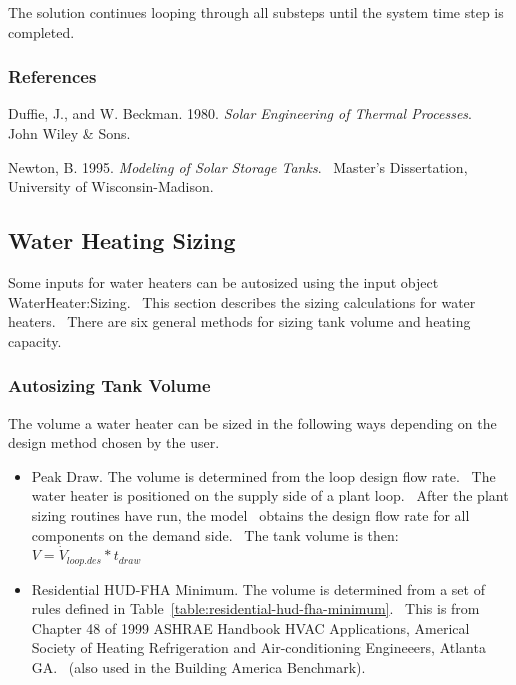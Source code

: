 The solution continues looping through all substeps until the system time step is completed.

\subsubsection{References}\label{references-1-017}

Duffie, J., and W. Beckman. 1980. \emph{Solar Engineering of Thermal Processes}.~ John Wiley \& Sons.

Newton, B. 1995. \emph{Modeling of Solar Storage Tanks}.~ Master's Dissertation, University of Wisconsin-Madison.

\subsection{Water Heating Sizing}\label{water-heating-sizing}

Some inputs for water heaters can be autosized using the input object WaterHeater:Sizing.~ This section describes the sizing calculations for water heaters.~ There are six general methods for sizing tank volume and heating capacity.

\subsubsection{Autosizing Tank Volume}\label{autosizing-tank-volume}

The volume a water heater can be sized in the following ways depending on the design method chosen by the user.

\begin{itemize}
  \item Peak Draw. The volume is determined from the loop design flow rate.~ The water heater is positioned on the supply side of a plant loop.~ After the plant sizing routines have run, the model~ obtains the design flow rate for all components on the demand side.~ The tank volume is then: \(V = {\dot V_{loop.des}}*{t_{draw}}\)

  \item Residential HUD-FHA Minimum. The volume is determined from a set of rules defined in Table~\ref{table:residential-hud-fha-minimum}.~ This is from Chapter 48 of 1999 ASHRAE Handbook HVAC Applications, Americal Society of Heating Refrigeration and Air-conditioning Engineeers, Atlanta GA.~ (also used in the Building America Benchmark).
\end{itemize}


